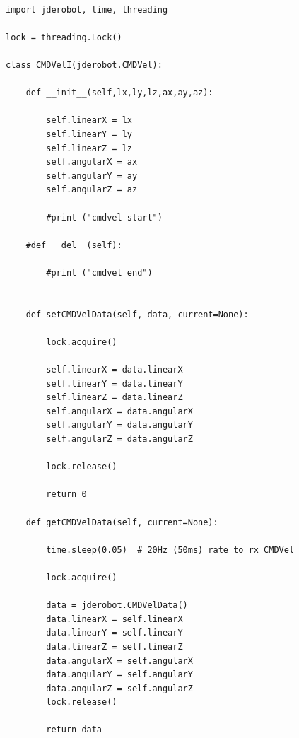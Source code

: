 \begin{lstlisting}[frame=single]

import jderobot, time, threading

lock = threading.Lock()

class CMDVelI(jderobot.CMDVel):

    def __init__(self,lx,ly,lz,ax,ay,az):

        self.linearX = lx
        self.linearY = ly
        self.linearZ = lz
        self.angularX = ax
        self.angularY = ay
        self.angularZ = az

        #print ("cmdvel start")

    #def __del__(self):

        #print ("cmdvel end")


    def setCMDVelData(self, data, current=None):

        lock.acquire()

        self.linearX = data.linearX
        self.linearY = data.linearY
        self.linearZ = data.linearZ
        self.angularX = data.angularX
        self.angularY = data.angularY
        self.angularZ = data.angularZ

        lock.release()

        return 0

    def getCMDVelData(self, current=None):

        time.sleep(0.05)  # 20Hz (50ms) rate to rx CMDVel

        lock.acquire()

        data = jderobot.CMDVelData()
        data.linearX = self.linearX
        data.linearY = self.linearY
        data.linearZ = self.linearZ
        data.angularX = self.angularX
        data.angularY = self.angularY
        data.angularZ = self.angularZ
        lock.release()

        return data
        
\end{lstlisting} 

